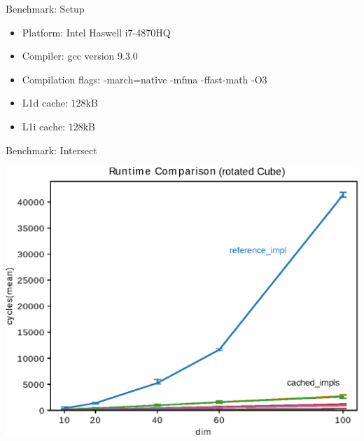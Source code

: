 \documentclass[table]{beamer}
\begin{document}
\begin{frame}{Benchmark: Setup}
    \begin{itemize}
	    \item Platform: Intel Haswell i7-4870HQ
	    \item Compiler: gcc version 9.3.0
	    \item Compilation flags: -march=native -mfma -ffast-math -O3
	    \item L1d cache: $128$kB
	    \item L1i cache: $128$kB
	\end{itemize}
\end{frame}

\begin{frame}{Benchmark: Intersect}
	\begin{center}
	    \includegraphics[scale=0.7]{polytopeT_1.eps}
	\end{center}
\end{frame}
\end{document}
